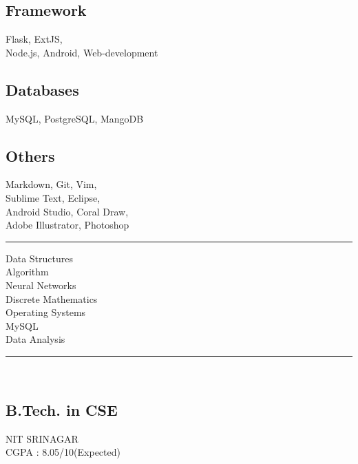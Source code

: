 \documentclass[localFont,alternative,10pt,compact]{main}
\begin{document}
\begin{minipage}[t]{0.33\textwidth}
        \subsection{Framework}
        Flask, ExtJS, \\Node.js, Android,
        Web-development
        \vspace{6pt}

        \subsection{Databases}
        MySQL, PostgreSQL, MangoDB
        \vspace{6pt}

        \subsection{Others}
        Markdown, Git, Vim, \\Sublime Text, Eclipse,\\
        Android Studio, Coral Draw,\\
        Adobe Illustrator, Photoshop
        \sectionsep

        \noindent\rule{5cm}{0.4pt}

        Data Structures\\
        Algorithm\\
        Neural Networks\\
        Discrete Mathematics\\
        Operating Systems\\
        MySQL\\
        Data Analysis
        \sectionsep


        \noindent\rule{5cm}{0.4pt}\\

        \subsection{B.Tech. in CSE}
        NIT SRINAGAR \\
        CGPA : 8.05/10(Expected)\\
        \vspace{8pt}


\end{minipage}
\end{document}
